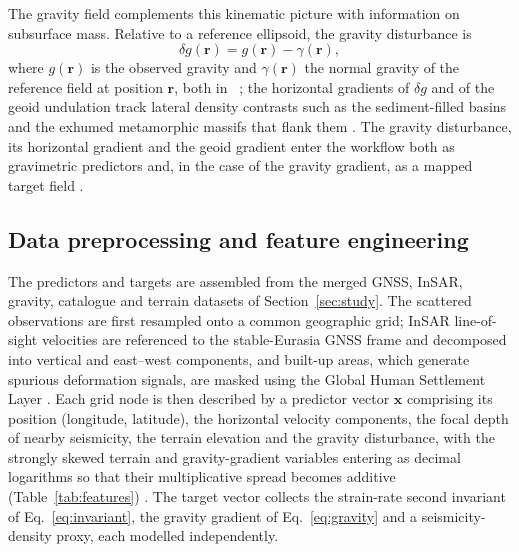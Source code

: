\documentclass[pdflatex,sn-mathphys-num]{sn-jnl}%
\theoremstyle{thmstyleone}%
\theoremstyle{thmstyletwo}%
\theoremstyle{thmstylethree}%
\begin{document}
The gravity field complements this kinematic picture with information on subsurface
mass. Relative to a reference ellipsoid, the gravity disturbance is
\begin{equation}
\delta g(\mathbf{r})=g(\mathbf{r})-\gamma(\mathbf{r}),
\label{eq:gravity}
\end{equation}
where $g(\mathbf{r})$ is the observed gravity and $\gamma(\mathbf{r})$ the normal
gravity of the reference field at position $\mathbf{r}$, both in
\si{\milli\gal}; the horizontal gradients of $\delta g$ and of the geoid undulation
track lateral density contrasts such as the sediment-filled basins and the exhumed
metamorphic massifs that flank them \cite{Pavlis2012,Foerste2014,Sandwell2014}. The
gravity disturbance, its horizontal gradient and the geoid gradient enter the workflow
both as gravimetric predictors and, in the case of the gravity gradient, as a mapped
target field \cite{Pavlis2012,Foerste2014,Lemenkova202216,Sandwell2014,Tapley2004,Wessel2019}.

\subsection{Data preprocessing and feature engineering}\label{sec:prep}
The predictors and targets are assembled from the merged GNSS, InSAR, gravity,
catalogue and terrain datasets of Section~\ref{sec:study}. The scattered observations
are first resampled onto a common geographic grid; InSAR line-of-sight velocities are
referenced to the stable-Eurasia GNSS frame and decomposed into vertical and
east--west components, and built-up areas, which generate spurious deformation signals,
are masked using the Global Human Settlement Layer
\cite{Weiss2020,Morishita2020,Hooper2012,Yu2018,Fialko2001,Massonnet1993,Goldstein1988,Rosen2000,Hanssen2001,Okada1985,Pesaresi2023}. Each grid node is then described by a
predictor vector $\mathbf{x}$ comprising its position (longitude, latitude), the
horizontal velocity components, the focal depth of nearby seismicity, the terrain
elevation and the gravity disturbance, with the strongly skewed terrain and
gravity-gradient variables entering as decimal logarithms so that their multiplicative
spread becomes additive (Table~\ref{tab:features})
\cite{Farr2007,GEBCO2023,Lemenkova202301,Harris2020,Tadono2014,Virtanen2020}. The target vector collects
the strain-rate second invariant of Eq.~\eqref{eq:invariant}, the gravity gradient of
Eq.~\eqref{eq:gravity} and a seismicity-density proxy, each modelled independently.
\end{document}
